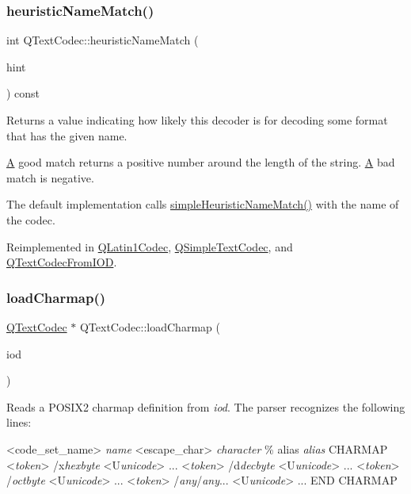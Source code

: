 \subsubsection{\texorpdfstring{heuristicNameMatch()}{heuristicNameMatch()}}
{\footnotesize\ttfamily int Q\+Text\+Codec\+::heuristic\+Name\+Match (\begin{DoxyParamCaption}\item[{const char $\ast$}]{hint }\end{DoxyParamCaption}) const\hspace{0.3cm}{\ttfamily [virtual]}}

Returns a value indicating how likely this decoder is for decoding some format that has the given name.

\mbox{\hyperlink{class_a}{A}} good match returns a positive number around the length of the string. \mbox{\hyperlink{class_a}{A}} bad match is negative.

The default implementation calls \mbox{\hyperlink{class_q_text_codec_a16459bb8c9e7c502547f45e5387fbb03}{simple\+Heuristic\+Name\+Match()}} with the name of the codec. 

Reimplemented in \mbox{\hyperlink{class_q_latin1_codec_a34f0298855e849d6c4bd67a7115971ec}{Q\+Latin1\+Codec}}, \mbox{\hyperlink{class_q_simple_text_codec_ab08ae2e5e99af1cd6dda3450731e502b}{Q\+Simple\+Text\+Codec}}, and \mbox{\hyperlink{class_q_text_codec_from_i_o_d_af7109ff23e3f6c34228eb046578c0357}{Q\+Text\+Codec\+From\+I\+OD}}.

\mbox{\label{class_q_text_codec_acf1f7d7dc7f47e434b269eb8efd458de}} 
\subsubsection{\texorpdfstring{loadCharmap()}{loadCharmap()}}
{\footnotesize\ttfamily \mbox{\hyperlink{class_q_text_codec}{Q\+Text\+Codec}} $\ast$ Q\+Text\+Codec\+::load\+Charmap (\begin{DoxyParamCaption}\item[{\mbox{\hyperlink{class_q_i_o_device}{Q\+I\+O\+Device}} $\ast$}]{iod }\end{DoxyParamCaption})\hspace{0.3cm}{\ttfamily [static]}}

Reads a P\+O\+S\+I\+X2 charmap definition from {\itshape iod}. The parser recognizes the following lines\+: 
\begin{DoxyPre}
   <code\_set\_name> {\itshape name}
   <escape\_char> {\itshape character}
   \% alias {\itshape alias}
   CHARMAP
   <{\itshape token}> /x{\itshape hexbyte} <U{\itshape unicode}> ...
   <{\itshape token}> /d{\itshape decbyte} <U{\itshape unicode}> ...
   <{\itshape token}> /{\itshape octbyte} <U{\itshape unicode}> ...
   <{\itshape token}> /{\itshape any}/{\itshape any}... <U{\itshape unicode}> ...
   END CHARMAP
\end{DoxyPre}


